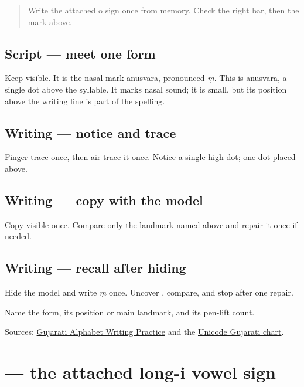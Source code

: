 \label{lesson:GU-W03-anusvara}



\begin{quote}
Write the attached o sign once from memory. Check the right bar, then the mark above.
\end{quote}

\subsection*{Script — meet one form}
Keep \textbf{} visible. It is the nasal mark anusvara, pronounced \emph{ṃ}. This is anusvāra, a single dot above the syllable. It marks nasal sound; it is small, but its position above the writing line is part of the spelling.

\subsection*{Writing — notice and trace}

Finger-trace \textbf{} once, then air-trace it once. Notice a single high dot; one dot placed above.

\subsection*{Writing — copy with the model}
Copy visible \textbf{} once. Compare only the landmark named above and repair it once if needed.

\subsection*{Writing — recall after hiding}
Hide the model and write \emph{ṃ} once. Uncover \textbf{}, compare, and stop after one repair.

\begin{tcolorbox}[breakable,colback=teal!4,colframe=teal!35!black,title={Before you move on}]
Name the form, its position or main landmark, and its pen-lift count.

Sources: \href{https://www.t30apps.com/gujarati-alphabet-writing/}{Gujarati Alphabet Writing Practice} and the \href{https://www.unicode.org/charts/PDF/U0A80.pdf}{Unicode Gujarati chart}.
\end{tcolorbox}
\section[\texorpdfstring{\gu{ી} (-ī)}{ી (-ī)}]{ — the attached long-i vowel sign}

